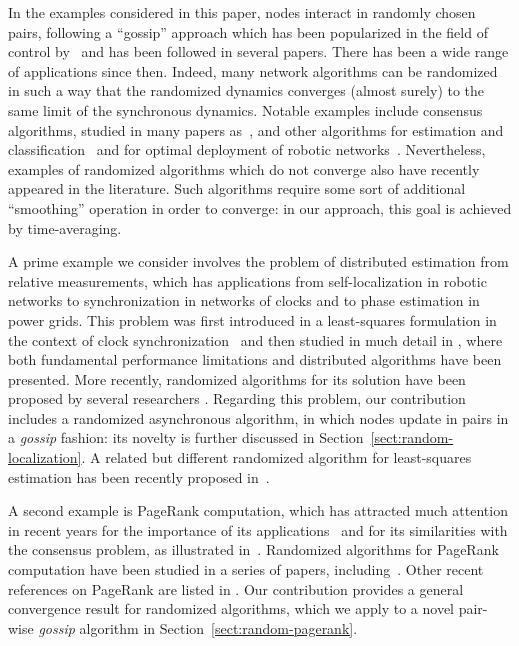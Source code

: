 \documentclass{IEEEtran}
\newcommand{\1}{\mathbf{1}} \newcommand{\ind}{\mathds{1}}
\begin{document}
In the examples considered in this paper, nodes interact in randomly chosen pairs, following a ``gossip'' approach which has been popularized in the field of control by~\cite{SB-AG-BP-DS:06} and has been followed in several papers. 
There has been a wide range of applications since then. Indeed, many network algorithms can be randomized in such a way that the randomized dynamics converges (almost surely) to the same limit of the synchronous dynamics.
Notable examples include consensus algorithms, studied in many papers as~\cite{FF-SZ:08a,ATS-AJ:08}, and other algorithms for estimation and classification~\cite{AC-FF-LS-SZ:10} and for optimal deployment of robotic networks~\cite{FB-RC-PF:08u}.
Nevertheless, examples of randomized algorithms which do not converge also have recently appeared in the literature. Such algorithms require some sort of additional ``smoothing'' operation in order to converge: in our approach, this goal is achieved by time-averaging.


A prime example we consider involves the problem of distributed estimation from relative measurements, which has applications from self-localization in robotic networks to synchronization in networks of clocks and to phase estimation in power grids. This problem was first introduced in a least-squares formulation in the context of clock synchronization~\cite{AG-PRK:06a} and then studied in much detail in \cite{PB-JPH:07,PB-JPH:08,PB-JPH:09,SB-SDF-LS-DV:10,WSR-PF-FF:12}, where both fundamental performance limitations and distributed algorithms have been presented. More recently, randomized algorithms for its solution have been proposed by several researchers \cite{NMF-AZ:12,RC-AC-LS-MT:13}. Regarding this problem, our contribution includes a randomized asynchronous algorithm, in which nodes update in pairs in a {\em gossip} fashion: its novelty is further discussed in Section~\ref{sect:random-localization}. A related but different randomized algorithm for least-squares estimation has been recently proposed in~\cite{KY-SS-LQ:14}.

A second example is PageRank computation, which has attracted much attention in recent years for the importance of its applications~\cite{SB-LP:98,KB-TL:06,ANL-CDM:06} and for its similarities with the consensus problem, as illustrated in~\cite{HI-RT:10}. Randomized algorithms for PageRank computation have been studied in a series of papers, including~\cite{HI-RT:10,Nazin:2011:RAD:1960870.1960904,HI-RT-EWB:12b,DBLP:journals/corr/abs-1305-3178}.
Other recent references on PageRank are listed in \cite{journals/corr/abs-1203-6606,fercoq:hal-00782749, Blondel13}.
Our contribution provides a general convergence result for randomized algorithms, which we apply to a novel pair-wise {\it gossip} algorithm in Section~\ref{sect:random-pagerank}.
\end{document}
